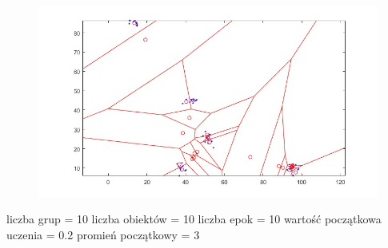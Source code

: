 \documentclass[11pt]{article}
\begin{document}
\begin{figure}[h!]
  \includegraphics{screeny/WTM_batch/WTM_batch_5_groups/WTM_batch_Areas.jpg}
\end{figure}

liczba grup = 10 liczba obiektów = 10 liczba epok = 10 wartość
początkowa uczenia = 0.2 promień początkowy = 3
\end{document}
